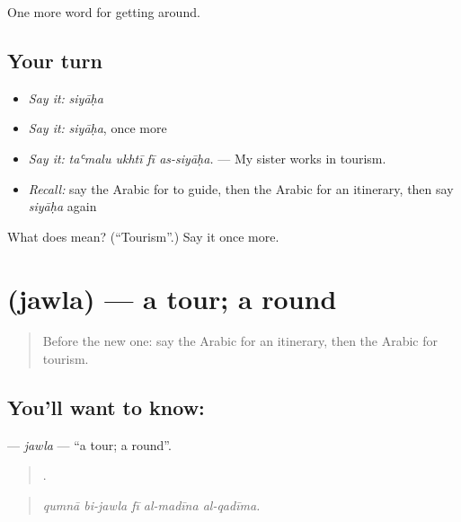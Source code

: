 \begin{grammarlens}[title={What you've built}]
One more word for getting around.
\end{grammarlens}

\subsection*{Your turn}
\begin{itemize}
\raggedright
  \item \emph{Say it:} \emph{siyāḥa}
  \item \emph{Say it:} \emph{siyāḥa}, once more
  \item \emph{Say it:} \emph{taʿmalu ukhtī fī as-siyāḥa.} — My sister works in tourism.
  \item \emph{Recall:} say the Arabic for to guide, then the Arabic for an itinerary, then say \emph{siyāḥa} again
\end{itemize}

\begin{tcolorbox}[breakable,colback=teal!4,colframe=teal!35!black,title={Before you move on}]
What does  mean? (\textquotedblleft{}Tourism\textquotedblright{}.) Say it once more.
\end{tcolorbox}
\section[\texorpdfstring{\ar{جولة} (jawla)}{جولة (jawla)}]{ (jawla) — a tour; a round}

\label{lesson:AR-C438-jawla}



\begin{quote}
Before the new one: say the Arabic for an itinerary, then the Arabic for tourism.
\end{quote}

\subsection*{You'll want to know: }
\textbf{} — \emph{jawla} — \textquotedblleft{}a tour; a round\textquotedblright{}.

\begin{quote}
    .
\end{quote}

\begin{quote}
\emph{qumnā bi-jawla fī al-madīna al-qadīma.}
\end{quote}


